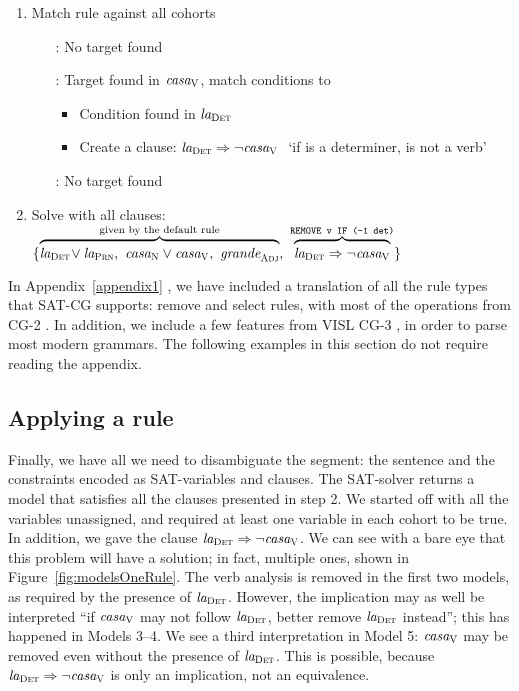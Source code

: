 \begin{enumerate}
\item Match rule against all cohorts
 \begin{itemize}
    \item[\la:] No target found
    \item[\casa:] Target found in $\text{\em casa}_{\text{\sc V}}$, match conditions to \la
      \begin{itemize}
       \item Condition found in $\text{\em la}_{\text{\sc Det}}$
       \item Create a clause: $\text{\em la}_{\text{\sc Det}} \Rightarrow \neg \text{\em casa}_{\text{\sc V}} \ $ `if \la{} is a determiner, \casa{} is not a verb'
      \end{itemize}
    \item[\grande:] No target found
  \end{itemize}
\item Solve with all clauses: 
  $\{ \ob{\laDet \! \vee \laPrn, \ \casaN \vee \casaV, \  \grandeAdj}^{\text{given by the default rule}}, \ 
      \ob{\laDet \Rightarrow \neg \casaV}^{\t{REMOVE v IF (-1 det)}} \}$
\end{enumerate}

In Appendix~\ref{appendix1}
, we have included a translation of all the rule types that SAT-CG supports: 
{\sc remove} and {\sc select} rules, with most of the operations from CG-2 \cite{tapanainen1996}. In addition, we include a few features from VISL CG-3 \cite{vislcg3}, in order to parse most modern grammars.
The following examples in this section do not require reading the appendix.

\subsection{Applying a rule}


Finally, we have all we need to disambiguate the segment: the sentence and the constraints encoded as SAT-variables and clauses. The SAT-solver returns a model that satisfies all the clauses presented in step 2.
We started off with all the variables unassigned, and required at least one variable 
in each cohort to be true. In addition, we gave the clause $\text{\em la}_{\text{\sc Det}} \Rightarrow \neg \text{\em casa}_{\text{\sc V}}$.
We can see with a bare eye that this problem will have a solution; in fact, multiple ones, 
shown in Figure~\ref{fig:modelsOneRule}.
The verb analysis is removed in the first two models, as required by the presence of $\text{\em la}_{\text{\sc Det}}$. However, the implication may as well be interpreted ``if $\text{\em casa}_{\text{\sc V}}$ may not follow $\text{\em la}_{\text{\sc Det}}$, better remove $\text{\em la}_{\text{\sc Det}}$ instead''; this has happened in Models 3--4. 
We see a third interpretation in Model 5: $\text{\em casa}_{\text{\sc V}}$ may be removed even without 
the presence of $\text{\em la}_{\text{\sc Det}}$. This is possible, because $\text{\em la}_{\text{\sc Det}} \Rightarrow \neg \text{\em casa}_{\text{\sc V}}$ is only an implication, not an equivalence.

